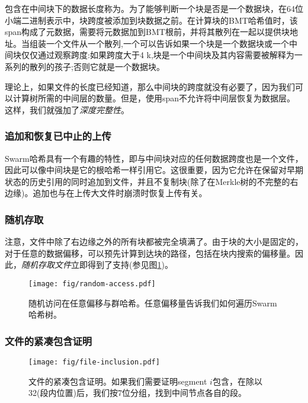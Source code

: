包含在中间块下的数据长度称为。为了能够判断一个块是否是一个数据块，在64位小端二进制表示中，块跨度被添加到块数据之前。在计算块的BMT哈希值时，该span构成了元数据，需要将元数据加到BMT根前，并将其散列在一起以提供块地址。当组装一个文件从一个散列,一个可以告诉如果一个块是一个数据块或一个中间块仅仅通过观察跨度:如果跨度大于4 k,块是一个中间块及其内容需要被解释为一系列的散列的孩子;否则它就是一个数据块。

理论上，如果文件的长度已经知道，那么中间块的跨度就没有必要了，因为我们可以计算树所需的中间层的数量。但是，使用span不允许将中间层恢复为数据层。这样，我们就强加了\emph{深度完整性}。 

\subsubsection{追加和恢复已中止的上传}

Swarm哈希具有一个有趣的特性，即与中间块对应的任何数据跨度也是一个文件，因此可以像中间块是它的根哈希一样引用它。这很重要，因为它允许在保留对早期状态的历史引用的同时追加到文件，并且不复制块(除了在Merkle树的不完整的右边缘)。追加也与在上传大文件时崩溃时恢复上传有关。

\subsubsection{随机存取}

注意，文件中除了右边缘之外的所有块都被完全填满了。由于块的大小是固定的，对于任意的数据偏移，可以预先计算到达块的路径，包括在块内搜索的偏移量。因此，\emph{随机存取文件}立即得到了支持(参见图\ref{fig:random-access})。


\begin{figure}[htbp]
\centering
\texttt{[image: fig/random-access.pdf]}
\caption[随机访问在任意偏移量与群哈希\statusgreen]{随机访问在任意偏移与群哈希。任意偏移量告诉我们如何遍历Swarm哈希树。}
\label{fig:random-access}
\end{figure}

\subsubsection{文件的紧凑包含证明}


\begin{figure}[htbp]
\centering
\texttt{[image: fig/file-inclusion.pdf]}
\caption[压缩包含证明文件\statusgreen]{文件的紧凑包含证明。如果我们需要证明segment $i$包含，在除以32(段内位置)后，我们按7位分组，找到中间节点各自的段。}
\label{fig:file-inclusion}
\end{figure}


